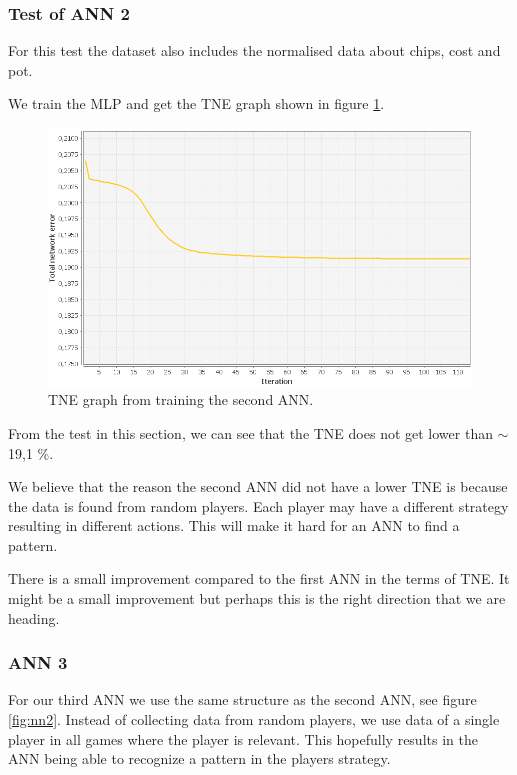 


\subsubsection{Test of ANN 2}
\label{sec:ann-test2}
For this test the dataset also includes the normalised data about chips, cost and pot.

We train the MLP and get the TNE graph shown in figure \ref{fig:tneg2}.

\begin{figure}[H]
  \center
    \includegraphics[scale=0.6]{images/nn/default-nn2-err.png}
  \caption{TNE graph from training the second ANN.\label{fig:tneg2}}
\end{figure}

From the test in this section, we can see that the TNE does not get lower than $\sim$19,1 \%. 


We believe that the reason the second ANN did not have a lower TNE is because the data is found from random players. Each player may have a different strategy resulting in different actions. This will make it hard for an ANN to find a pattern. 

There is a small improvement compared to the first ANN in the terms of TNE. It might be a small improvement but perhaps this is the right direction that we are heading.



\subsubsection{ANN 3}
\label{sec:design3}
For our third ANN we use the same structure as the second ANN, see figure \ref{fig:nn2}. Instead of collecting data from random players, we use data of a single player in all games where the player is relevant. This hopefully results in the ANN being able to recognize a pattern in the players strategy.


